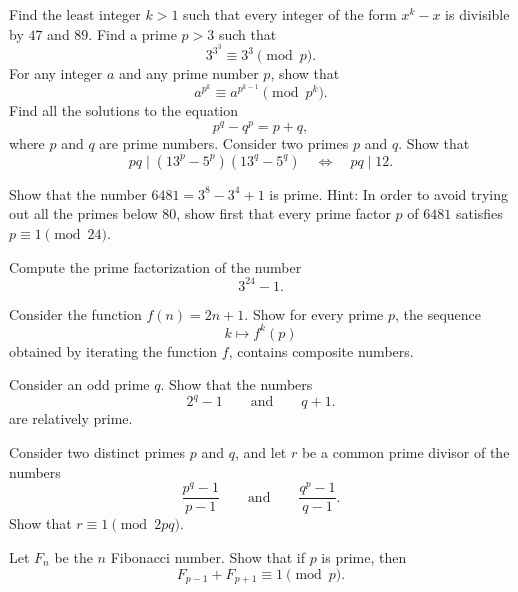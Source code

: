 \begin{challenge}
  \exercise Find the least integer $k>1$ such that every integer of the form $x^k-x$ is divisible by $47$ and $89$.
  \exercise Find a prime $p>3$ such that
  \begin{equation*}
    3^{3^3}\equiv 3^3\pmod{p}.
  \end{equation*}
  \exercise For any integer $a$ and any prime number $p$, show that
  \begin{equation*}
    a^{p^k} \equiv a^{p^{k-1}} \pmod{p^k}.
  \end{equation*}
  \exercise Find all the solutions to the equation
  \begin{equation*}
    p^q-q^p=p+q,
  \end{equation*}
  where $p$ and $q$ are prime numbers.
  \exercise Consider two primes $p$ and $q$. Show that
  \begin{equation*}
    pq\mid (13^p-5^p)(13^q-5^q)\quad\Leftrightarrow\quad pq\mid 12.
  \end{equation*}
  \exercise
  \begin{subexenum}
  \item Show that the number $6481=3^8-3^4+1$ is prime. Hint: In order to avoid trying out all the primes below $80$, show first that every prime factor $p$ of $6481$ satisfies $p\equiv 1\pmod{24}$.
  \item Compute the prime factorization of the number
    \begin{equation*}
      3^{24}-1.
    \end{equation*}
  \end{subexenum}
  \exercise Consider the function $f(n)=2n+1$. Show for every prime $p$, the sequence
  \begin{equation*}
    k\mapsto f^k(p)
  \end{equation*}
  obtained by iterating the function $f$, contains composite numbers.
  \exercise \label{exercise:prime-divisors-feit-thompson-conjecture}
  \begin{subexenum}
  \item Consider an odd prime $q$. Show that the numbers
    \begin{equation*}
      2^q-1 \qquad\text{and}\qquad q+1.
    \end{equation*}
    are relatively prime.
  \item Consider two distinct primes $p$ and $q$, and let $r$ be a common prime divisor of the numbers
  \begin{equation*}
    \frac{p^q-1}{p-1}\qquad\text{and}\qquad\frac{q^p-1}{q-1}.
  \end{equation*}
  Show that $r\equiv 1\pmod{2pq}$.  
  \end{subexenum}
  \exercise Let $F_n$ be the $n$\supth{} Fibonacci number. Show that if $p$ is prime, then
  \begin{equation*}
    F_{p-1}+F_{p+1}\equiv 1\pmod{p}.
  \end{equation*}
\end{challenge}

